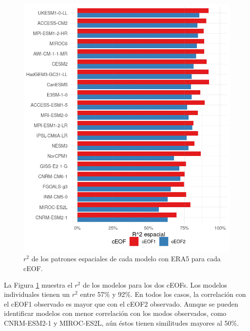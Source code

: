 \documentclass[12pt,oneside,a4paper]{reedthesis}
\begin{document}
\begin{figure}

{\centering \includegraphics{figures/50-cmip6/comparacion-r2-1} 

}

\caption{\(r^2\) de los patrones espaciales de cada modelo con ERA5 para cada cEOF.}\label{fig:comparacion-r2}
\end{figure}

La Figura \ref{fig:comparacion-r2} muestra el \(r^2\) de los modelos para los dos cEOFs.
Los modelos individuales tienen un \(r^2\) entre 57\% y 92\%.
En todos los casos, la correlación con el cEOF1 observado es mayor que con el cEOF2 observado.
Aunque se pueden identificar modelos con menor correlación con los modos observados, como CNRM-ESM2-1 y MIROC-ES2L, aún éstos tienen similitudes mayores al 50\%.
\end{document}
